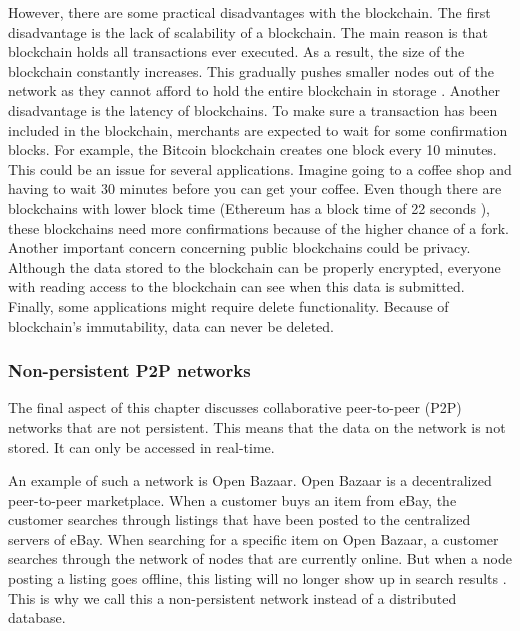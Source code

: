 However, there are some practical disadvantages with the blockchain. The first disadvantage is the lack of scalability of a blockchain. The main reason is that blockchain holds all transactions ever executed. As a result, the size of the blockchain constantly increases. This gradually pushes smaller nodes out of the network as they cannot afford to hold the entire blockchain in storage \cite{blockchain-scalability}. Another disadvantage is the latency of blockchains. To make sure a transaction has been included in the blockchain, merchants are expected to wait for some confirmation blocks. For example, the Bitcoin blockchain creates one block every 10 minutes. This could be an issue for several applications. Imagine going to a coffee shop and having to wait 30 minutes before you can get your coffee. Even though there are blockchains with lower block time (Ethereum has a block time of 22 seconds \cite{Ethereum-block-time}), these blockchains need more confirmations because of the higher chance of a fork. Another important concern concerning public blockchains could be privacy. Although the data stored to the blockchain can be properly encrypted, everyone with reading access to the blockchain can see when this data is submitted. Finally, some applications might require delete functionality. Because of blockchain's immutability, data can never be deleted.

\subsubsection{Non-persistent P2P networks}

The final aspect of this chapter discusses collaborative peer-to-peer (P2P) networks that are not persistent. This means that the data on the network is not stored. It can only be accessed in real-time. 

An example of such a network is Open Bazaar. Open Bazaar is a decentralized peer-to-peer marketplace. When a customer buys an item from eBay, the customer searches through listings that have been posted to the centralized servers of eBay. When searching for a specific item on Open Bazaar, a customer searches through the network of nodes that are currently online. But when a node posting a listing goes offline, this listing will no longer show up in search results \cite{openbazaar-faq}. This is why we call this a non-persistent network instead of a distributed database.

